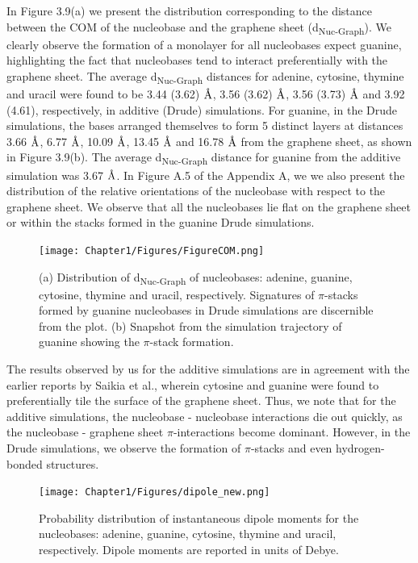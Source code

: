     In Figure 3.9(a) we present the distribution corresponding to the distance between the COM of the nucleobase and the graphene sheet (d\textsubscript{Nuc-Graph}). We clearly observe the formation of a monolayer for all nucleobases expect guanine, highlighting the fact that nucleobases tend to interact preferentially with the graphene sheet. The average d\textsubscript{Nuc-Graph} distances for adenine, cytosine, thymine and uracil were found to be 3.44 (3.62) $\text{\normalfont\AA}$, 3.56 (3.62) $\text{\normalfont\AA}$, 3.56 (3.73) $\text{\normalfont\AA}$ and 3.92 (4.61), respectively, in additive (Drude) simulations. For guanine, in the Drude simulations, the bases arranged themselves to form 5 distinct layers at distances 3.66 $\text{\normalfont\AA}$, 6.77 $\text{\normalfont\AA}$, 10.09 $\text{\normalfont\AA}$, 13.45 $\text{\normalfont\AA}$ and 16.78 $\text{\normalfont\AA}$ from the graphene sheet, as shown in Figure 3.9(b). The average d\textsubscript{Nuc-Graph} distance for guanine from the additive simulation was 3.67 $\text{\normalfont\AA}$. In Figure A.5 of the Appendix A, we we also present the distribution of the relative orientations of the nucleobase with respect to the graphene sheet. We observe that all the nucleobases lie flat on the graphene sheet or within the stacks formed in the guanine Drude simulations.
    \begin{figure}
        \centering
        \texttt{[image: Chapter1/Figures/FigureCOM.png]}
        \caption[Distribution of d\textsubscript{Nuc-Graph} of nucleobases: adenine, guanine, cytosine, thymine and uracil, respectively. Snapshot from the simulation trajectory of guanine showing the $\pi$-stack formation]{ (a) Distribution of d\textsubscript{Nuc-Graph} of nucleobases: adenine, guanine, cytosine, thymine and uracil, respectively. Signatures of $\pi$-stacks formed by guanine nucleobases in Drude simulations are discernible from the plot. (b) Snapshot from the simulation trajectory of guanine showing the $\pi$-stack formation.}
    \end{figure}

    The results observed by us for the additive simulations are in agreement with the earlier reports by Saikia et al.,\supercite{saikia_hierarchical_2017, saikia_dynamics_2018} wherein cytosine and guanine were found to preferentially tile the surface of the graphene sheet. Thus, we note that for the additive simulations, the nucleobase - nucleobase interactions die out quickly, as the nucleobase - graphene sheet $\pi$-interactions become dominant. However, in the Drude simulations, we observe the formation of $\pi$-stacks and even hydrogen-bonded structures.
    \begin{figure}
        \centering
        \texttt{[image: Chapter1/Figures/dipole\_new.png]}
        \caption[Probability distribution of instantaneous dipole moments for the nucleobases: adenine, guanine, cytosine, thymine and uracil, respectively]{Probability distribution of instantaneous dipole moments for the nucleobases: adenine, guanine, cytosine, thymine and uracil, respectively. Dipole moments are reported in units of Debye.}
    \end{figure}
    
